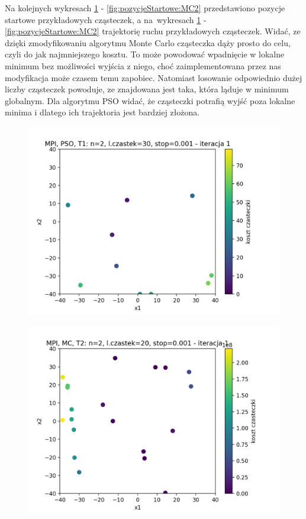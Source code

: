 \documentclass[11pt, a4paper, oneside]{article}
\begin{document}
Na kolejnych wykresach \ref{fig:pozycjeStartowe:PSO1} - \ref{fig:pozycjeStartowe:MC2} przedstawiono pozycje startowe przykładowych cząsteczek, a na~wykresach   \ref{fig:pozycjeStartowe:PSO1} - \ref{fig:pozycjeStartowe:MC2} trajektorię ruchu przykładowych cząsteczek. Widać, ze dzięki zmodyfikowaniu algorytmu Monte Carlo cząsteczka dąży prosto do celu, czyli do jak najmniejszego kosztu. To może powodować wpadnięcie w lokalne minimum bez możliwości wyjścia z niego, choć zaimplementowana przez nas modyfikacja może czasem temu zapobiec. Natomiast losowanie odpowiednio dużej liczby cząsteczek powoduje, ze znajdowana jest taka, która ląduje w minimum globalnym. Dla algorytmu PSO widać, że cząsteczki potrafią wyjść poza lokalne minima i dlatego ich trajektoria jest bardziej złożona.

\begin{figure}[H]
\centering
\begin{minipage}[b]{\dimexpr.5\textwidth-1em}
  \centering
  \includegraphics[width=1\linewidth]{grafiki/MPI_PSO_T1/MPI_PSO_T1_startPositions.png}
  \label{fig:pozycjeStartowe:PSO1}
\end{minipage} \hfill
\begin{minipage}[b]{\dimexpr.5\textwidth-1em}
  \centering
  \includegraphics[width=1\linewidth]{grafiki/MPI_MC_T2/MPI_MC_T2_startPositions.png}

\end{minipage}
\end{figure}
\end{document}
